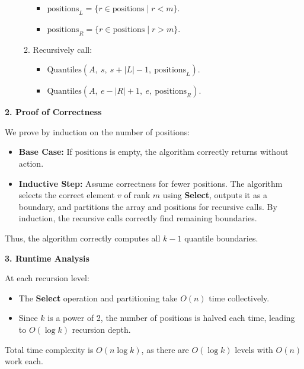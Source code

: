 \documentclass[11pt]{article}
\begin{document}
\begin{enumerate}
\begin{enumerate}
                \begin{itemize}
                    \item \(\text{positions}_L = \{ r \in \text{positions} \mid r < m \}\).
                    \item \(\text{positions}_R = \{ r \in \text{positions} \mid r > m \}\).
                \end{itemize}
            \item Recursively call:
                \begin{itemize}
                    \item \(\text{Quantiles}(A,\ s,\ s + |L| - 1,\ \text{positions}_L)\).
                    \item \(\text{Quantiles}(A,\ e - |R| + 1,\ e,\ \text{positions}_R)\).
                \end{itemize}
        \end{enumerate}
\end{enumerate}

\textbf{2. Proof of Correctness}

We prove by induction on the number of positions:

\begin{itemize}
    \item \textbf{Base Case:} If \(\text{positions}\) is empty, the algorithm correctly returns without action.
    \item \textbf{Inductive Step:} Assume correctness for fewer positions. The algorithm selects the correct element \(v\) of rank \(m\) using \textbf{Select}, outputs it as a boundary, and partitions the array and positions for recursive calls. By induction, the recursive calls correctly find remaining boundaries.
\end{itemize}

Thus, the algorithm correctly computes all \(k - 1\) quantile boundaries.

\textbf{3. Runtime Analysis}

At each recursion level:

\begin{itemize}
    \item The \textbf{Select} operation and partitioning take \(O(n)\) time collectively.
    \item Since \(k\) is a power of 2, the number of positions is halved each time, leading to \(O(\log k)\) recursion depth.
\end{itemize}

Total time complexity is \(O(n \log k)\), as there are \(O(\log k)\) levels with \(O(n)\) work each.
\end{document}
